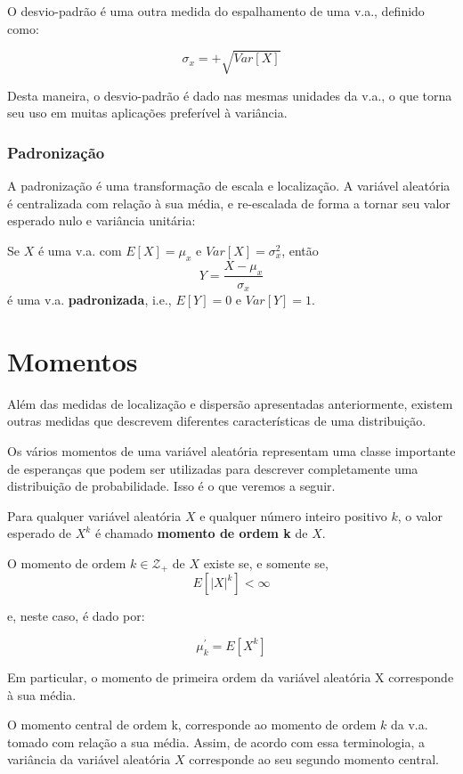 \documentclass[
]{book}
\theoremstyle{definition}
\theoremstyle{definition}
\theoremstyle{definition}
\theoremstyle{remark}
\begin{document}
O desvio-padrão é uma outra medida do espalhamento de uma v.a., definido como:

\[{\sigma_x = +\sqrt{Var[X]}}\]

Desta maneira, o desvio-padrão é dado nas mesmas unidades da v.a., o que torna seu uso em muitas aplicações preferível à variância.

\hypertarget{padronizauxe7uxe3o}{%
\subsubsection*{Padronização}\label{padronizauxe7uxe3o}}

A padronização é uma transformação de escala e localização. A variável aleatória é centralizada com relação à sua média, e re-escalada de forma a tornar seu valor esperado nulo e variância unitária:

Se \(X\) é uma v.a. com \({E[X] = \mu_x}\) e \({Var[X] = \sigma^2_x}\), então\\
\[{Y = \frac{X - \mu_x}{\sigma_x}}\]
é uma v.a. \textbf{padronizada}, i.e., \({E[Y] = 0}\) e \({Var[Y] = 1}\).

\hypertarget{momentos}{%
\section{Momentos}\label{momentos}}

Além das medidas de localização e dispersão apresentadas anteriormente, existem outras medidas que descrevem diferentes características de uma distribuição.

Os vários momentos de uma variável aleatória representam uma classe importante de esperanças que podem ser utilizadas para descrever completamente uma distribuição de probabilidade. Isso é o que veremos a seguir.

Para qualquer variável aleatória \(X\) e qualquer número inteiro positivo \(k\), o valor esperado de \(X^k\) é chamado \textbf{momento de ordem k} de \(X\).

O momento de ordem \({k \in \mathcal{Z}_+}\) de \(X\) existe se, e somente se,
\[{E[|X|^k] < \infty}\]

e, neste caso, é dado por:

\[{\mu_k^\prime = E[X^k]}\]

Em particular, o momento de primeira ordem da variável aleatória X corresponde à sua média.

O momento central de ordem k, corresponde ao momento de ordem \(k\) da v.a. tomado com relação a sua média. Assim, de acordo com essa terminologia, a variância da variável aleatória \(X\) corresponde ao seu segundo momento central.
\end{document}

